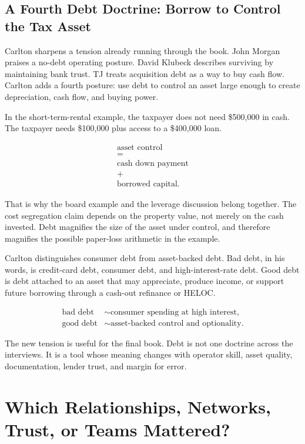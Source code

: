 \documentclass[11pt,oneside]{book}
\begin{document}
\section{A Fourth Debt Doctrine: Borrow to Control the Tax Asset}

Carlton sharpens a tension already running through the book. John Morgan praises a no-debt operating posture. David Klubeck describes surviving by maintaining bank trust. TJ treats acquisition debt as a way to buy cash flow. Carlton adds a fourth posture: use debt to control an asset large enough to create depreciation, cash flow, and buying power.

In the short-term-rental example, the taxpayer does not need \$500,000 in cash. The taxpayer needs \$100,000 plus access to a \$400,000 loan.

\begin{equation}
\begin{gathered}
\text{asset control}\\
=\\
\text{cash down payment}\\
+\\
\text{borrowed capital}.
\end{gathered}
\end{equation}

That is why the board example and the leverage discussion belong together. The cost segregation claim depends on the property value, not merely on the cash invested. Debt magnifies the size of the asset under control, and therefore magnifies the possible paper-loss arithmetic in the example.

Carlton distinguishes consumer debt from asset-backed debt. Bad debt, in his words, is credit-card debt, consumer debt, and high-interest-rate debt. Good debt is debt attached to an asset that may appreciate, produce income, or support future borrowing through a cash-out refinance or HELOC.

\begin{align}
\text{bad debt} &\sim \text{consumer spending at high interest},\\
\text{good debt} &\sim \text{asset-backed control and optionality}.
\end{align}

The new tension is useful for the final book. Debt is not one doctrine across the interviews. It is a tool whose meaning changes with operator skill, asset quality, documentation, lender trust, and margin for error.

\chapter{Which Relationships, Networks, Trust, or Teams Mattered?}
\end{document}
